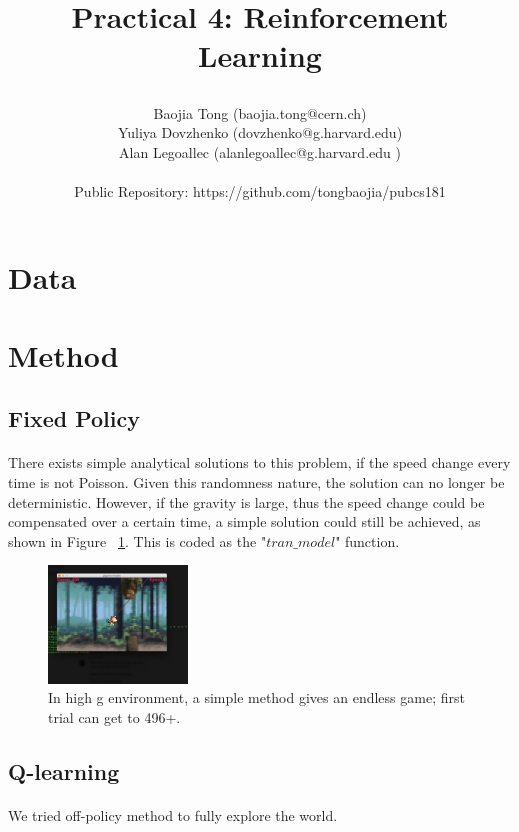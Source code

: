 \documentclass[11pt]{article}
\title{\begin{center}
{\Large Practical 4: Reinforcement Learning}
\end{center}}
\author{ Baojia Tong (baojia.tong@cern.ch)\\Yuliya Dovzhenko (dovzhenko@g.harvard.edu)\\Alan Legoallec (alanlegoallec@g.harvard.edu )\\\\Public Repository: https://github.com/tongbaojia/pubcs181}
\begin{document}
\maketitle{}

\section{Data}
\paragraph{}

\section{Method}
\subsection{Fixed Policy}
\paragraph{}
There exists simple analytical solutions to this problem, if the speed change every time is not Poisson. Given this randomness nature, the solution can no longer be deterministic. However, if the gravity is large, thus the speed change could be compensated over a certain time, a simple solution could still be achieved, as shown in Figure ~\ref{FixedPolicy}. This is coded as the "$tran\_model$" function.
\begin{figure}[] 
\centering
        \includegraphics[width=0.33\textwidth]{Plot/highscore.png}
        \caption{In high g environment, a simple method gives an endless game; first trial can get to 496+.}
            \label{FixedPolicy}
\end{figure}

\subsection{Q-learning}
\paragraph{}
We tried off-policy method to fully explore the world.
 
\end{document}
